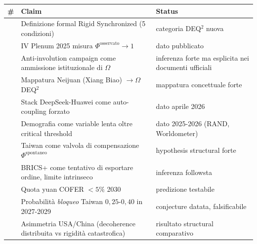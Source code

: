 {\def\LTcaptype{none} %
{\small\begin{longtable}[]{@{}
  >{\raggedright\arraybackslash}p{}
  >{\raggedright\arraybackslash}p{}
  >{\raggedright\arraybackslash}p{}@{}}
\toprule\noalign{}
\begin{minipage}[b]{\linewidth}\raggedright
\#
\end{minipage} & \begin{minipage}[b]{\linewidth}\raggedright
Claim
\end{minipage} & \begin{minipage}[b]{\linewidth}\raggedright
Status
\end{minipage} \\
\midrule\noalign{}
\endhead
\bottomrule\noalign{}
\endlastfoot
1 & Definizione formal Rigid Synchronized (5 condizioni) & \Hypoth{}
categoria DEQ$^2$ nuova \\
2 & IV Plenum 2025 misura \(\Phi^{\text{osservato}} \to 1\) & \Proved{}
dato pubblicato \\
3 & Anti-involution campaign come ammissione istituzionale di \(\Omega\)
& \Hypoth{} inferenza forte ma esplicita nei documenti ufficiali \\
4 & Mappatura Neijuan (Xiang Biao) \(\to \Omega\) DEQ$^2$ & \Hypoth{}
mappatura concettuale forte \\
5 & Stack DeepSeek-Huawei come auto-coupling forzato & \Proved{}
dato aprile 2026 \\
6 & Demografia come variable lenta oltre critical threshold & \Proved{}
dato 2025-2026 (RAND, Worldometer) \\
7 & Taiwan come valvola di compensazione \(\Phi^{\text{spontaneo}}\) &
\Conj{} hypothesis structural forte \\
8 & BRICS+ come tentativo di esportare ordine, limite intrinseco &
\Hypoth{} inferenza followsta \\
9 & Quota yuan COFER \(< 5\%\) 2030 & \Conj{} predizione testabile \\
10 & Probabilità \emph{bloqueo} Taiwan \(0{,}25\)-\(0{,}40\) in
2027-2029 & \Conj{} conjecture datata, falsificabile \\
11 & Asimmetria USA/China (decoherence distribuita vs rigidità
catastrofica) & \Hypoth{} risultato structural comparativo \\
\end{longtable}}
}




